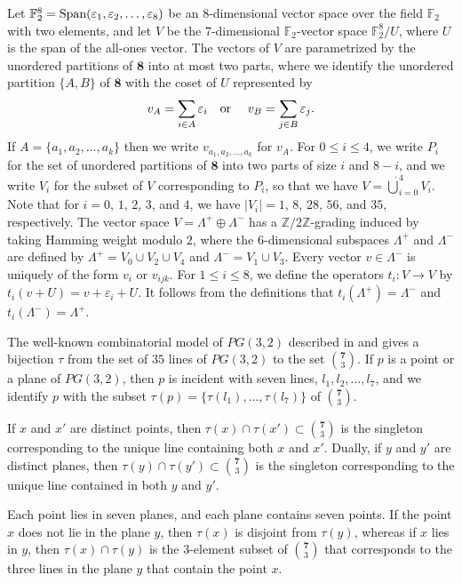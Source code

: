 \documentclass{amsart}
\theoremstyle{plain}
\theoremstyle{definition}
\theoremstyle{remark}
\numberwithin{equation}{section}
\newcommand{\ep}{\varepsilon}
\newcommand{\Z}{{\mathbb Z}}
\newcommand{\F}{{\mathbb F}}
\newcommand{\ra}{\rightarrow}
\newcommand{\Span}{\text{\rm Span}}
\newcommand{\seven}{{\mathbf 7}}
\newcommand{\eight}{{\mathbf 8}}
\newcommand{\lamp}{\Lambda^+}
\newcommand{\lamm}{\Lambda^-}
\begin{document}
Let $\F_2^8 = \Span(\ep_1, \ep_2, \ldots, \ep_8)$ be an $8$-dimensional vector space over the field $\F_2$ with two 
elements, and let $V$ be the $7$-dimensional $\F_2$-vector space $\F_2^8/U$, where $U$ is the span of the all-ones 
vector. The vectors of $V$ are parametrized by the unordered partitions of $\eight$ into at most two parts, where
we identify the unordered partition $\{A, B\}$ of $\eight$ with the coset of $U$ represented by $$
v_A = \sum_{i \in A} \ep_i \text{\quad or \quad} v_B = \sum_{j \in B} \ep_j
.$$ If $A = \{a_1, a_2, \ldots, a_k\}$ then we write $v_{a_1, a_2, \ldots, a_k}$ for $v_A$. For $0 \leq i \leq 4$, 
we write $P_i$ for the set of unordered partitions of $\eight$ into two parts of size $i$ and $8-i$, and we write
$V_i$ for the subset of $V$ corresponding to $P_i$, so that we have $V = \dot\bigcup_{i = 0}^4 V_i$. Note that for 
$i = 0$, $1$, $2$, $3$, and $4$, we have $|V_i| = 1$, $8$, $28$, $56$, and $35$, respectively. The vector space 
$V = \lamp \oplus \lamm$ has a $\Z/2\Z$-grading induced by taking Hamming weight modulo $2$, where the $6$-dimensional 
subspaces $\lamp$ and $\lamm$ are defined by $\lamp = V_0 \cup V_2 \cup V_4$ and $\lamm = V_1 \cup V_3$. Every vector 
$v \in \lamm$ is uniquely of the form $v_i$ or $v_{ijk}$. For $1 \leq i \leq 8$, we define the operators 
$t_i : V \ra V$ by $t_i(v + U) = v + \ep_i + U$. It follows from the definitions that $t_i(\lamp) = \lamm$ and 
$t_i(\lamm) = \lamp$.

The well-known combinatorial model of $PG(3, 2)$ described in \cite[\S2]{hall80} and \cite[Appendix 1B]{wagner61}
gives a bijection $\tau$ from the set of $35$ lines of $PG(3, 2)$ to the set $\binom{\seven}{3}$. If $p$ is a point or a 
plane of $PG(3, 2)$, then $p$ is incident with seven lines, $l_1, l_2, \ldots, l_7$, and we identify $p$ with the subset 
$\tau(p) = \{\tau(l_1), \ldots, \tau(l_7)\}$ of $\binom{\seven}{3}$.

If $x$ and $x'$ are distinct points, then $\tau(x) \cap \tau(x') \subset \binom{\seven}{3}$ is the singleton corresponding 
to the unique line containing both $x$ and $x'$. Dually, if $y$ and $y'$ are distinct planes, then 
$\tau(y) \cap \tau(y') \subset \binom{\seven}{3}$ is the singleton corresponding to the unique line contained in both 
$y$ and $y'$.

Each point lies in seven planes, and each plane contains seven points. If the point $x$ does not lie in the plane $y$,
then $\tau(x)$ is disjoint from $\tau(y)$, whereas if $x$ lies in $y$, then $\tau(x) \cap \tau(y)$ is the $3$-element subset
of $\binom{\seven}{3}$ that corresponds to the three lines in the plane $y$ that contain the point $x$.
\end{document}
